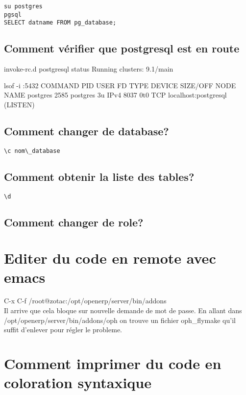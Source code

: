 \documentclass[12pt,a4paper]{article}
\begin{document}
\begin{verbatim}
su postgres
pgsql 
SELECT datname FROM pg_database;
\end{verbatim}

\subsection{Comment vérifier que postgresql est en route}
\label{sec:postgresql}

invoke-rc.d postgresql status
Running clusters: 9.1/main 

lsof -i :5432
COMMAND   PID     USER   FD   TYPE DEVICE SIZE/OFF NODE NAME
postgres 2585 postgres    3u  IPv4   8037      0t0  TCP localhost:postgresql (LISTEN)

\subsection{Comment changer de database?}
\label{sec:ch_database}
\begin{verbatim}
\c nom\_database
\end{verbatim}
\subsection{Comment obtenir la liste des tables?}
\label{sec:table_list}
\begin{verbatim}
\d
\end{verbatim}
\subsection{Comment changer de role?}
\label{sec:role}


\section{Editer du code en remote avec emacs}
\label{sec:emacs-remote}

C-x C-f /root@zotac:/opt/openerp/server/bin/addons \\
Il arrive que cela bloque sur nouvelle demande de mot de passe. En allant dans /opt/openerp/server/bin/addons/oph on trouve un fichier oph\_flymake qu'il suffit d'enlever pour régler le probleme.

\section{Comment imprimer du code en coloration syntaxique}
\label{sec:print_color}
\end{document}
